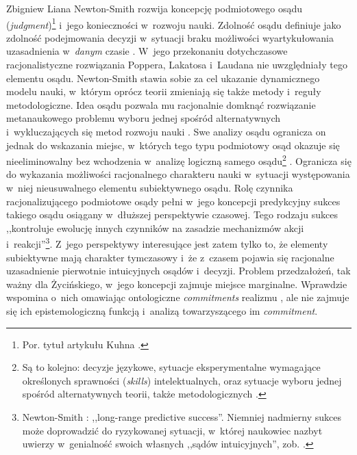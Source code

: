 \begin{artplenv}{Zbigniew Liana}
Newton-Smith
\parencite*[][]{newton-smith_rationality_1981} %
 rozwija koncepcję podmiotowego osądu (\textit{judgment})\footnote{Por. tytuł artykułu Kuhna 
\parencite*[][]{kuhn_objectivity_1977}.%
} i~jego konieczności w~rozwoju nauki. Zdolność osądu definiuje jako zdolność podejmowania decyzji w~sytuacji braku możliwości wyartykułowania uzasadnienia w~\textit{danym} czasie 
\parencite[][s.~234]{newton-smith_rationality_1981}. %
 W~jego przekonaniu dotychczasowe racjonalistyczne rozwiązania Poppera, Lakatosa i~Laudana nie uwzględniały tego elementu osądu. Newton-Smith stawia sobie za cel ukazanie dynamicznego modelu nauki, w~którym oprócz teorii zmieniają się także metody i~reguły metodologiczne. Idea osądu pozwala mu racjonalnie domknąć rozwiązanie metanaukowego problemu wyboru jednej spośród alternatywnych i~wykluczających się metod rozwoju nauki 
\parencite[][s.~270]{newton-smith_rationality_1981}. %
 Swe analizy osądu ogranicza on jednak do wskazania miejsc, w~których tego typu podmiotowy osąd okazuje się nieeliminowalny bez wchodzenia w~analizę logiczną samego osądu\footnote{Są to kolejno: decyzje językowe, sytuacje eksperymentalne wymagające określonych sprawności (\textit{skills}) intelektualnych, oraz sytuacje wyboru jednej spośród alternatywnych teorii, także metodologicznych 
\parencite[zob.][s.~232–235]{newton-smith_rationality_1981}.%
} . Ogranicza się do wykazania możliwości racjonalnego charakteru nauki w~sytuacji występowania w~niej nieusuwalnego elementu subiektywnego osądu. Rolę czynnika racjonalizującego podmiotowe osądy pełni w~jego koncepcji predykcyjny sukces takiego osądu osiągany w~dłuższej perspektywie czasowej. Tego rodzaju sukces ,,kontroluje ewolucję innych czynników na zasadzie mechanizmów akcji i~reakcji''\footnote{Newton-Smith 
\parencite*[][s.~270]{newton-smith_rationality_1981}: %
 ,,long-range predictive success''. Niemniej nadmierny sukces może doprowadzić do ryzykowanej sytuacji, w~której naukowiec nazbyt uwierzy w~genialność swoich własnych ,,sądów intuicyjnych'', zob. 
\parencite[][s.~234n]{newton-smith_rationality_1981}.%
}. Z~jego perspektywy interesujące jest zatem tylko to, że elementy subiektywne mają charakter tymczasowy i~że z~czasem pojawia się racjonalne uzasadnienie pierwotnie intuicyjnych osądów i~decyzji. Problem przedzałożeń, tak ważny dla Życińskiego, w~jego koncepcji zajmuje miejsce marginalne. Wprawdzie wspomina o~nich omawiając ontologiczne \textit{commitments} realizmu 
\parencite[][s.~38]{newton-smith_rationality_1981}, %
 ale nie zajmuje się ich epistemologiczną funkcją i~analizą towarzyszącego im \textit{commitment}.


\end{artplenv}
